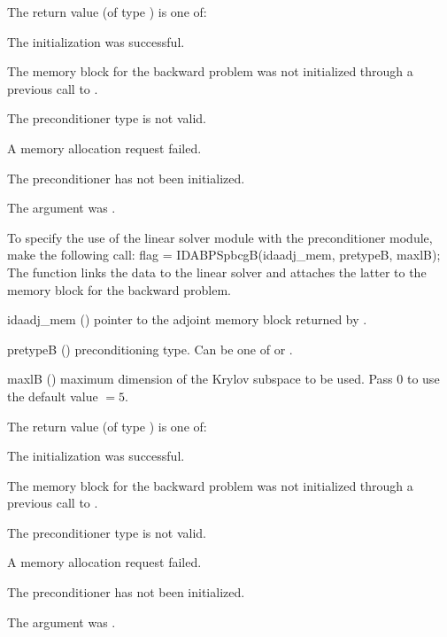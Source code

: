 {
  The return value  (of type ) is one of:
  \begin{args}
  \item[\Id{IDASPILS\_SUCCESS}]
    The {\idaspgmr} initialization was successful.
  \item[\Id{IDASPILS\_MEM\_NULL}]
    The {\idas} memory block for the backward problem was not initialized through a 
    previous call to .
  \item[\Id{IDASPILS\_ILL\_INPUT}]
    The preconditioner type  is not valid.
  \item[\Id{IDASPILS\_MEM\_FAIL}]
    A memory allocation request failed.
  \item[\Id{IDABANDPRE\_PDATA\_NULL}]
    The {\idabandpre} preconditioner has not been initialized.
  \item[\Id{IDABANDPRE\_ADJMEM\_NULL}]
    The  argument was .
  \end{args}
}
{}
To specify the use of the {\idaspbcg} linear solver module with the {\idabandpre} 
preconditioner module, make the following call:
{
  flag = IDABPSpbcgB(idaadj\_mem, pretypeB, maxlB);
}
{
  The function  links the {\idabandpre} data to the
  {\idaspbcg} linear solver and attaches the latter to the {\idas}
  memory block for the backward problem.
}
{
  \begin{args}
  \item[idaadj\_mem] ()
    pointer to the adjoint memory block returned by .
  \item[pretypeB] ()
    preconditioning type. Can be one of  or .
  \item[maxlB] ()
    maximum dimension of the Krylov subspace to be used. Pass $0$ to use the 
    default value $=5$.
  \end{args}
}
{
  The return value  (of type ) is one of:
  \begin{args}
  \item[\Id{IDASPILS\_SUCCESS}]
    The {\idaspbcg} initialization was successful.
  \item[\Id{IDASPILS\_MEM\_NULL}]
    The {\idas} memory block for the backward problem was not initialized through a 
    previous call to .
  \item[\Id{IDASPILS\_ILL\_INPUT}]
    The preconditioner type  is not valid.
  \item[\Id{IDASPILS\_MEM\_FAIL}]
    A memory allocation request failed.
  \item[\Id{IDABANDPRE\_PDATA\_NULL}]
    The {\idabandpre} preconditioner has not been initialized.
  \item[\Id{IDABANDPRE\_ADJMEM\_NULL}]
    The  argument was .
  \end{args}
}
